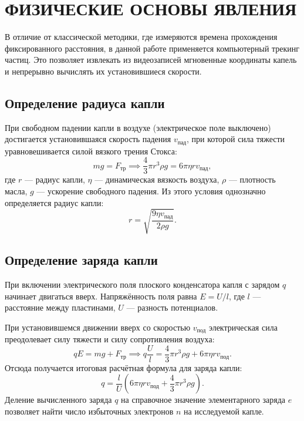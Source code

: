 \documentclass[reprint, amsmath, amssymb, aps, pra, nofootinbib]{revtex4-2}
\begin{document}
\section{ФИЗИЧЕСКИЕ ОСНОВЫ ЯВЛЕНИЯ}
В отличие от классической методики, где измеряются времена прохождения фиксированного расстояния, в данной работе применяется компьютерный трекинг частиц. Это позволяет извлекать из видеозаписей мгновенные координаты капель и непрерывно вычислять их установившиеся скорости.

\subsection{Определение радиуса капли}
При свободном падении капли в воздухе (электрическое поле выключено) достигается установившаяся скорость падения $v_{\text{пад}}$, при которой сила тяжести уравновешивается силой вязкого трения Стокса:
\begin{equation}
    mg = F_{\text{тр}} \implies \frac{4}{3}\pi r^3 \rho g = 6\pi\eta r v_{\text{пад}},
\end{equation}
где $r$ — радиус капли, $\eta$ — динамическая вязкость воздуха, $\rho$ — плотность масла, $g$ — ускорение свободного падения. Из этого условия однозначно определяется радиус капли:
\begin{equation}
    r = \sqrt{\frac{9\eta v_{\text{пад}}}{2\rho g}}.
    \label{eq:radius}
\end{equation}

\subsection{Определение заряда капли}
При включении электрического поля плоского конденсатора капля с зарядом $q$ начинает двигаться вверх. Напряжённость поля равна $E = U/l$, где $l$ — расстояние между пластинами, $U$ — разность потенциалов. 

При установившемся движении вверх со скоростью $v_{\text{под}}$ электрическая сила преодолевает силу тяжести и силу сопротивления воздуха:
\begin{equation}
    qE = mg + F_{\text{тр}} \implies q\frac{U}{l} = \frac{4}{3}\pi r^3 \rho g + 6\pi\eta r v_{\text{под}}.
\end{equation}
Отсюда получается итоговая расчётная формула для заряда капли:
\begin{equation}
    q = \frac{l}{U} \left( 6\pi\eta r v_{\text{под}} + \frac{4}{3}\pi r^3 \rho g \right).
    \label{eq:charge_final}
\end{equation}
Деление вычисленного заряда $q$ на справочное значение элементарного заряда $e$ позволяет найти число избыточных электронов $n$ на исследуемой капле.
\end{document}
